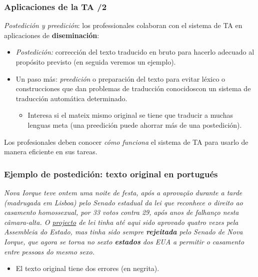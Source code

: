 \documentclass{beamer}
\newcommand{\empha}[1]{\emph{#1}\/}
\begin{document}
\begin{frame}
\frametitle{Aplicaciones de la TA /2}

\empha{Postedición y preedición}: los professionales colaboran con el
  sistema de TA en aplicaciones de \textbf{diseminación}:
\begin{itemize}
\item\empha{Postedición:} corrección del texto traducido en bruto para hacerlo adecuado al propósito previsto (en seguida veremos un ejemplo).
\item Un paso más: \empha{preedición} o preparación del texto para evitar
  léxico o construcciones que dan problemas de traducción conocidoscon un
  sistema de traducción automática determinado. 
  \begin{itemize}
  \item Interesa si el mateix mismo original se tiene que traducir a muchas lenguas meta (una preedición puede ahorrar más de una postedición).

  \end{itemize}
\end{itemize}

  Los profesionales deben conocer \empha{cómo funciona} el sistema de TA para usarlo de manera eficiente en sus tareas.

\end{frame}



\begin{frame}
  \frametitle{Ejemplo de postedición: texto original en portugués} 

  \empha{Nova Iorque teve ontem uma noite de festa, após a aprovação
    durante a tarde (madrugada em Lisboa) pelo Senado estadual da lei
    que reconhece o direito ao casamento homossexual, por 33 votos
    contra 29, após anos de falhanço nesta câmara-alta.  O
    \underline{projecto} de lei tinha até aqui sido aprovado quatro
    vezes pela Assembleia do Estado, mas tinha sido sempre
    \textbf{rejeitada} pelo Senado de Nova Iorque, que agora se torna
    no sexto \textbf{estados} dos EUA a permitir o casamento entre
    pessoas do mesmo sexo.}

  \begin{itemize}
  \item El texto original tiene dos errores (en negrita).
  \end{itemize}

\end{frame}
\end{document}

